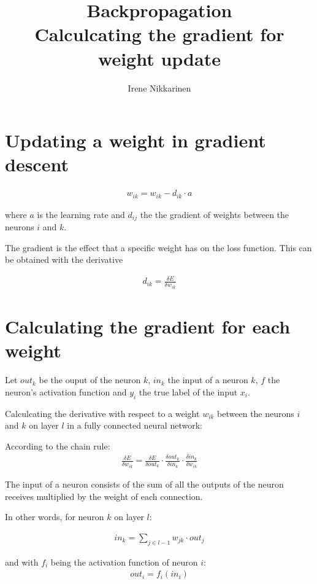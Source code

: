 \documentclass[a4paper, 12pt, finnish]{article}
\title{Backpropagation \\
  \large Calculcating the gradient for weight update}
\author{Irene Nikkarinen}
\begin{document}
   \maketitle

  \section{Updating a weight in gradient descent}

  \begin{align*}
    w_{ik} = w_{ik} - d_{ik} \cdot a
  \end{align*}

  where $a$ is the learning rate and $d_{ij}$ the the gradient of weights between the neurons $i$ and $k$.

  The gradient is the effect that a specific weight has on the loss function. This can be obtained with the derivative

  \begin{align*}
    d_{ik} =  \frac{\delta E}{\delta w_{ik}}
  \end{align*}


   \section{Calculating the gradient for each weight}

   Let $out_k$ be the ouput of the neuron $k$, $in_k$ the input of a neuron $k$, $f$ the neuron's activation function and $y_i$ the true label of the input $x_i$.

   Calculcating the derivative with respect to a weight $w_{ik}$ between the neurons $i$ and $k$ on layer $l$ in a fully connected neural network:

   According to the chain rule:
  \begin{align*}
   \frac{\delta E}{\delta w_{ik}} = \frac{\delta E}{\delta out_k} \cdot \frac{\delta out_k}{\delta in_k}\cdot \frac{\delta in_k}{\delta w_{ik}}
  \end{align*}

  The input of a neuron consists of the sum of all the outputs of the neuron receives multiplied by the weight of each connection.

  In other words, for neuron $k$ on layer $l$:

\begin{align*}
in_k = \sum_{j \in l-1} w_{jk}\cdot out_j
\end{align*}

  and with $f_i$ being the activation function of neuron $i$:
\begin{align*}
  out_i = f_i(in_i)
  \end{align*}
\end{document}
